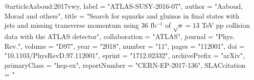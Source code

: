 @article{Aaboud:2017vwy,
      label          = "ATLAS-SUSY-2016-07",
      author         = "Aaboud, Morad and others",
      title          = "{Search for squarks and gluinos in final states with jets
                        and missing transverse momentum using 36  fb$^{-1}$ of
                        $\sqrt{s}=13$  TeV pp collision data with the ATLAS
                        detector}",
      collaboration  = "ATLAS",
      journal        = "Phys. Rev.",
      volume         = "D97",
      year           = "2018",
      number         = "11",
      pages          = "112001",
      doi            = "10.1103/PhysRevD.97.112001",
      eprint         = "1712.02332",
      archivePrefix  = "arXiv",
      primaryClass   = "hep-ex",
      reportNumber   = "CERN-EP-2017-136",
      SLACcitation   = "%
}

